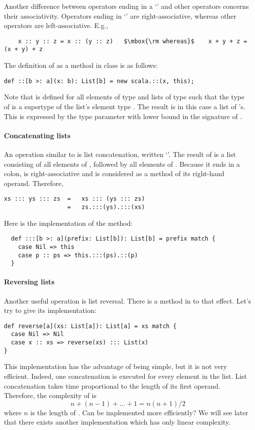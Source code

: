 Another difference between operators ending in a `\code{:}' and other
operators concerns their associativity.  Operators ending in
`\code{:}' are right-associative, whereas other operators are
left-associative.  E.g.,
\begin{lstlisting}
    x :: y :: z = x :: (y :: z)   $\mbox{\rm whereas}$    x + y + z = (x + y) + z
\end{lstlisting}
The definition of \code{::} as a method in
class  is as follows:
\begin{lstlisting}
def ::[b >: a](x: b): List[b] = new scala.::(x, this);
\end{lstlisting}
Note that \code{::} is defined for all elements  of type
 and lists of type  such that the type 
of  is a supertype of the list's element type . The result
is in this case a list of 's. This
is expressed by the type parameter  with lower bound 
in the signature of \code{::}. 

\paragraph{Concatenating lists}
An operation similar to \code{::} is list concatenation, written
`\code{:::}'. The result of  is a list consisting of
all elements of , followed by all elements of .
Because it ends in a colon, \code{:::} is right-associative and is
considered as a method of its right-hand operand. Therefore,
\begin{lstlisting}
xs ::: ys ::: zs  =   xs ::: (ys ::: zs)
                  =   zs.:::(ys).:::(xs)
\end{lstlisting}
Here is the implementation of the \code{:::} method:
\begin{lstlisting}
  def :::[b >: a](prefix: List[b]): List[b] = prefix match {
    case Nil => this
    case p :: ps => this.:::(ps).::(p)
  }
\end{lstlisting}

\paragraph{Reversing lists} Another useful operation
is list reversal. There is a method  in  to
that effect. Let's try to give its implementation:
\begin{lstlisting}
def reverse[a](xs: List[a]): List[a] = xs match {
  case Nil => Nil
  case x :: xs => reverse(xs) ::: List(x)
}
\end{lstlisting}
This implementation has the advantage of being simple, but it is not
very efficient.  Indeed, one concatenation is executed for every
element in the list. List concatenation takes time proportional to the
length of its first operand. Therefore, the complexity of
 is
\[
n + (n - 1) + ... + 1 = n(n+1)/2
\]
where $n$ is the length of . Can  be
implemented more efficiently? We will see later that there exists
another implementation which has only linear complexity.

